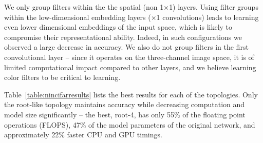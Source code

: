 \documentclass[thesis]{subfiles}
\begin{document}
	We only group filters within the the spatial (\ie non 1$\times$1) layers. Using filter groups within the low-dimensional embedding layers ($\times$1 convolutions) leads to learning even lower dimensional embeddings of the input space, which is likely to compromise their representational ability. Indeed, in such configurations we observed a large decrease in accuracy. We also do not group filters in the first convolutional layer -- since it operates on the three-channel image space, it is of limited computational impact compared to other layers, and we believe learning color filters to be critical to learning. 
	
	Table~\ref{table:nincifarresults} lists the best results for each of the topologies.
	Only the root-like topology maintains accuracy while decreasing computation and model size significantly -- the best, root-4, has only 55\% of the floating point operations (FLOPS), 47\% of the model parameters of the original network, and approximately 22\% faster CPU and GPU timings.
	
\end{document}
